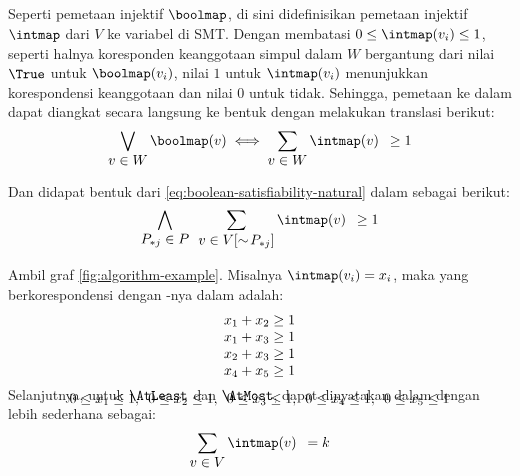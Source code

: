 \subsection{}

Seperti pemetaan injektif \(\boolmap\), di sini didefinisikan pemetaan injektif \(\intmap\) dari \(V\) ke variabel  di SMT. Dengan membatasi \(0 \leq \intmap(v_i) \leq 1\), seperti halnya koresponden keanggotaan simpul dalam \(W\) bergantung dari nilai \(\True\) untuk \(\boolmap(v_i)\), nilai \(1\) untuk \(\intmap(v_i)\) menunjukkan korespondensi keanggotaan dan nilai \(0\) untuk tidak. Sehingga, pemetaan  ke dalam  dapat diangkat secara langsung ke bentuk  dengan melakukan translasi berikut:
\[
	\bigvee \limits_{\displaystyle v \in W} \boolmap(v)
	\iff
	\sum \limits_{\displaystyle v \in W} \intmap(v) \enspace \geq 1
\]

Dan didapat bentuk dari \autoref{eq:boolean-satisfiability-natural} dalam  sebagai berikut:
\begin{equation}
	\bigwedge \limits_{\displaystyle P_{*j} \in P} \enspace \sum \limits_{\displaystyle v \in V[\sim\!P_{*j}]} \intmap(v) \enspace \geq 1
	\label{eq:linear-integer-arithmetic-natural}
\end{equation}

\begin{example}
	Ambil graf \autoref{fig:algorithm-example}. Misalnya \(\intmap(v_i) = x_i\), maka  yang berkorespondensi dengan -nya dalam  adalah:
	\[
		\smash[b]{
		\begin{array}{c}
			x_1 + x_2 \geq 1 \\
			x_1 + x_3 \geq 1 \\
			x_2 + x_3 \geq 1 \\
			x_4 + x_5 \geq 1 \\ [8pt]
			0 \leq x_1 \leq 1,\enspace
			0 \leq x_2 \leq 1,\enspace
			0 \leq x_3 \leq 1,\enspace
			0 \leq x_4 \leq 1,\enspace
			0 \leq x_5 \leq 1
		\end{array}
		} \vspace{1em}
	\]
\end{example}

\clearpage

Selanjutnya, untuk  \(\AtLeast\) dan \(\AtMost\), dapat dinyatakan dalam  dengan lebih sederhana sebagai:
\begin{equation}
	\sum \limits_{\displaystyle v \in V} \intmap(v) \enspace = k
	\label{eq:linear-integer-arithmetic-cardinality}
\end{equation}


